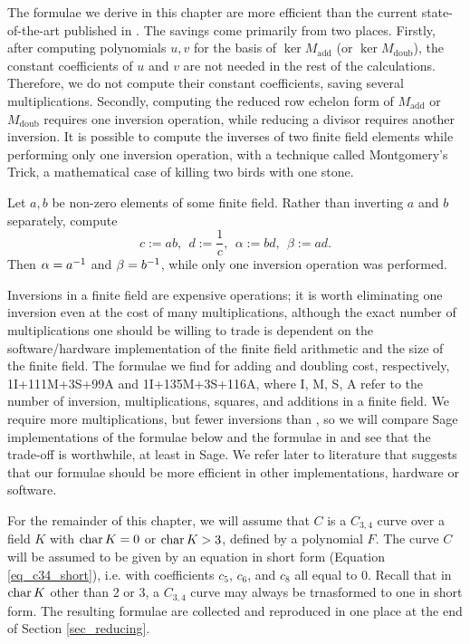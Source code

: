 The formulae we derive in this chapter are more efficient than the current state-of-the-art published in \cite{kmakdisi18}.
The savings come primarily from two places.
Firstly, after computing polynomials $u,v$ for the basis of $\ker M_{\text{add}}$ (or $\ker M_{\text{doub}}$),
the constant coefficients of $u$ and $v$ are not needed in the rest of the calculations.
Therefore, we do not compute their constant coefficients, saving several multiplications.
Secondly, computing the reduced row echelon form of $M_{\text{add}}$ or $M_{\text{doub}}$ requires one inversion
operation, while reducing a divisor requires another inversion.
It is possible to compute the inverses of two finite field elements while performing only one inversion operation,
with a technique called Montgomery's Trick,
a mathematical case of killing two birds with one stone.
\begin{example}
  \label{ex_two_birds_one_stone}
  Let $a, b$ be non-zero elements of some finite field.
  Rather than inverting $a$ and $b$ separately, compute
  \[ c := ab, ~~ d := \frac 1 c, ~~ \alpha := bd, ~~ \beta := ad. \]
  Then $\alpha = a^{-1}$ and $\beta = b^{-1}$, while only one inversion operation was performed.
\end{example}
Inversions in a finite field are expensive operations;
it is worth eliminating one inversion even at the cost of many multiplications,
although the exact number of multiplications one should be willing to trade is dependent on
the software/hardware implementation of the finite field arithmetic and the size of the finite field.
The formulae we find for adding and doubling cost, respectively, 1I+111M+3S+99A and 1I+135M+3S+116A,
where I, M, S, A refer to the number of inversion, multiplications, squares, and additions in a finite field.
We require more multiplications, but fewer inversions than \cite{kmakdisi18},
so we will compare Sage implementations of the formulae below and the formulae in \cite{kmakdisi18}
and see that the trade-off is worthwhile, at least in Sage.
We refer later to literature that suggests that our formulae should be more efficient in other implementations,
hardware or software.

For the remainder of this chapter, we will assume that $C$ is a $C_{3,4}$ curve
over a field $K$ with $\operatorname{char} K = 0$ or $\operatorname{char} K > 3$, defined by a polynomial $F$.
The curve $C$ will be assumed to be given by an equation in short form (Equation \ref{eq_c34_short}),
i.e. with coefficients $c_5$, $c_6$, and $c_8$ all equal to 0.
Recall that in $\operatorname{char} K$ other than 2 or 3, a $C_{3,4}$ curve may always be trnasformed to one in short form.
The resulting formulae are collected and reproduced in one place at the end of Section \ref{sec_reducing}.



